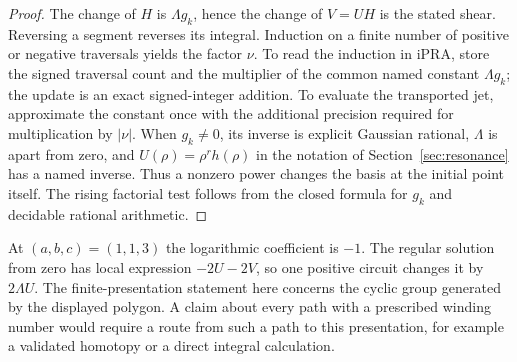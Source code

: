\begin{proof}
The change of $H$ is $\Lambda g_k$, hence the change of $V=UH$ is the stated shear. Reversing a segment reverses its integral. Induction on a finite number of positive or negative traversals yields the factor $\nu$. To read the induction in iPRA, store the signed traversal count and the multiplier of the common named constant $\Lambda g_k$; the update is an exact signed-integer addition. To evaluate the transported jet, approximate the constant once with the additional precision required for multiplication by $|\nu|$. When $g_k\ne0$, its inverse is explicit Gaussian rational, $\Lambda$ is apart from zero, and $U(\rho)=\rho^r h(\rho)$ in the notation of Section~\ref{sec:resonance} has a named inverse. Thus a nonzero power changes the basis at the initial point itself. The rising factorial test follows from the closed formula for $g_k$ and decidable rational arithmetic.
\end{proof}

At $(a,b,c)=(1,1,3)$ the logarithmic coefficient is $-1$. The regular solution from zero has local expression $-2U-2V$, so one positive circuit changes it by $2\Lambda U$. The finite-presentation statement here concerns the cyclic group generated by the displayed polygon. A claim about every path with a prescribed winding number would require a route from such a path to this presentation, for example a validated homotopy or a direct integral calculation.
